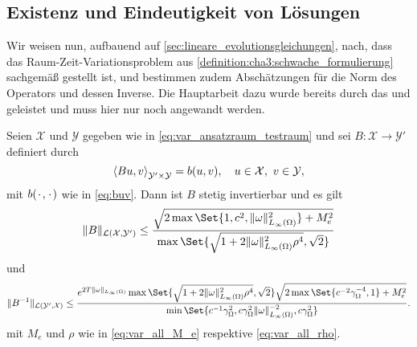 \subsection{Existenz und Eindeutigkeit von Lösungen} %
\label{sub:existenz_und_eindeutigkeit_von_l_sungen}

Wir weisen nun, aufbauend auf \autoref{sec:lineare_evolutionsgleichungen}, nach, dass das Raum-Zeit-Variationsproblem aus \ref{definition:cha3:schwache_formulierung} sachgemäß gestellt ist, und bestimmen zudem Abschätzungen für die Norm des Operators und dessen Inverse.
Die Hauptarbeit dazu wurde bereits durch das  und  geleistet und muss hier nur noch angewandt werden.


\begin{Korollar}
\label{korollar:2.2}
    Seien $\mathcal X$ und $\mathcal Y$ gegeben wie in \eqref{eq:var_ansatzraum_testraum} und sei $B \colon \mathcal X \to \mathcal Y'$ definiert durch
    \begin{equation}
        \left\langle Bu,v\right\rangle_{\mathcal Y' \times \mathcal Y}  = b(u, v), \quad u \in \mathcal X,~ v \in \mathcal Y,
    \end{equation}
    mit $b({\mkern2mu\cdot\mkern2mu}, {\mkern2mu\cdot\mkern2mu})$ wie in \eqref{eq:buv}.
    Dann ist $B$ stetig invertierbar und es gilt
    \begin{equation}
        \norm{B}_{\mathcal L(\mathcal X, \mathcal Y')}
        \leq
        \frac{\sqrt{2 \max\Set{1, c^{2}, \norm{\omega}_{L_{\infty}(\Omega)}^{2}} + M_{e}^{2}}}{\max\Set{\sqrt{1 + 2 \norm{\omega}_{L_{\infty}(\Omega)}^{2} \rho^{4}}, \sqrt{2} }}
    \end{equation}
    und
    \begin{equation}
        \norm{B^{-1}}_{\mathcal L( \mathcal Y', \mathcal X)}
        \leq \frac{e^{2 T \norm{\omega}_{L_{\infty}(\Omega)}} \max\Set{\sqrt{1 + 2 \norm{\omega}_{L_{\infty}(\Omega)}^{2} \rho^{4}}, \sqrt{2}} \sqrt{2 \max\Set{c^{-2} \gamma_{\Omega}^{-4}, 1} + M_{e}^{2}}}{\min\Set{c^{-1} \gamma_{\Omega}^{2}, c \gamma_{\Omega}^{2} \norm{\omega}_{L_{\infty}(\Omega)}^{-2}, c \gamma_{\Omega}^{2} }}.
    \end{equation}
    mit $M_{e}$ und $\rho$ wie in \eqref{eq:var_all_M_e} respektive \eqref{eq:var_all_rho}.
\end{Korollar}

